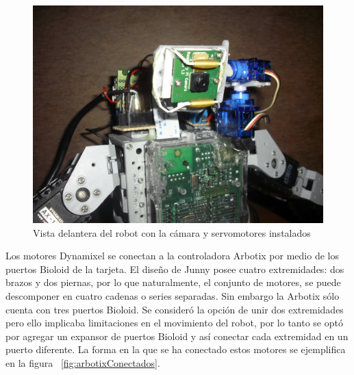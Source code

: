 
 
\begin{figure}[hbtp]
\centering
\includegraphics[scale=0.08]{imagenes/servosYcamara.JPG}
\caption{Vista delantera del robot con la cámara y servomotores instalados}
\label{fig:servosycam}
\end{figure}

Los motores Dynamixel se conectan a la controladora Arbotix por medio de los puertos Bioloid de la tarjeta. El diseño de Junny posee cuatro extremidades: dos brazos y dos piernas, por lo que naturalmente, el conjunto de motores, se puede descomponer en cuatro cadenas o series separadas. Sin embargo la Arbotix s\'olo cuenta con tres puertos Bioloid. Se consideró la opción de unir dos extremidades pero ello implicaba limitaciones en el movimiento del robot, por lo tanto se optó por agregar un expansor de puertos Bioloid y así conectar cada extremidad en un puerto diferente. La forma en la que se ha conectado estos motores se ejemplifica en la figura ~\ref{fig:arbotixConectados}. 

